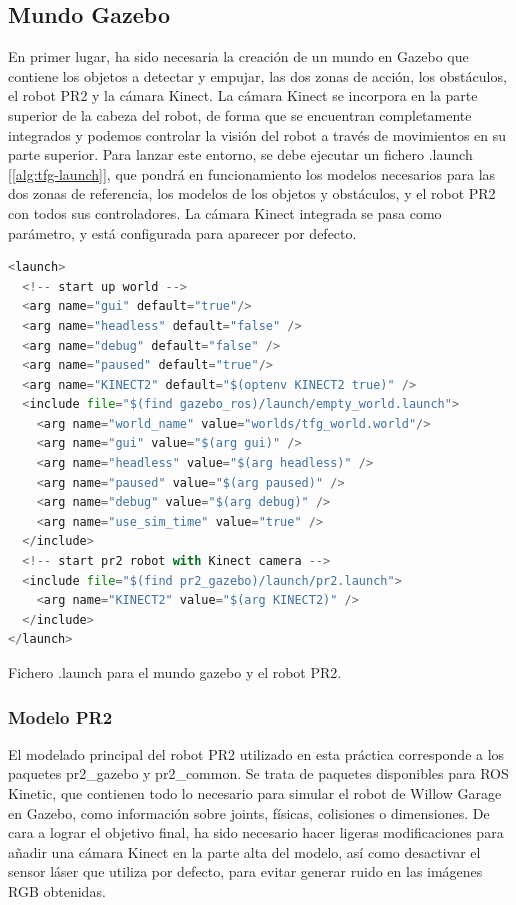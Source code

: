 \documentclass[12pt,spanish,chapterprefix, numbers=noenddot]{book}
\numberwithin{equation}{section}
\numberwithin{figure}{section}
\begin{document}
\subsection{Mundo Gazebo}
En primer lugar, ha sido necesaria la creación de un mundo en Gazebo que contiene los objetos a detectar y empujar, las dos zonas de acción, los obstáculos, el robot PR2 y la cámara Kinect.
La cámara Kinect se incorpora en la parte superior de la cabeza del robot, de forma que se encuentran completamente integrados y podemos controlar la visión del robot a través de movimientos en su parte superior.
Para lanzar este entorno, se debe ejecutar un fichero .launch [\ref{alg:tfg-launch}], que pondrá en funcionamiento los modelos necesarios para las dos zonas de referencia, los modelos de los objetos y obstáculos, y el robot PR2 con todos sus controladores. La cámara Kinect integrada se pasa como parámetro, y está configurada para aparecer por defecto. 
\vspace{20pt}
\begin{algorithm}[htb!]
\begin{lstlisting}[breaklines=true,language=python]
<launch>
  <!-- start up world -->
  <arg name="gui" default="true"/>
  <arg name="headless" default="false" />
  <arg name="debug" default="false" />
  <arg name="paused" default="true"/>
  <arg name="KINECT2" default="$(optenv KINECT2 true)" />
  <include file="$(find gazebo_ros)/launch/empty_world.launch">
    <arg name="world_name" value="worlds/tfg_world.world"/> 
    <arg name="gui" value="$(arg gui)" />
    <arg name="headless" value="$(arg headless)" />
    <arg name="paused" value="$(arg paused)" />
    <arg name="debug" value="$(arg debug)" />
    <arg name="use_sim_time" value="true" />
  </include>
  <!-- start pr2 robot with Kinect camera -->
  <include file="$(find pr2_gazebo)/launch/pr2.launch">
    <arg name="KINECT2" value="$(arg KINECT2)" />
  </include>
</launch>
\end{lstlisting}

\caption{\label{alg:tfg-launch}Fichero .launch para el mundo gazebo y el robot PR2.}
\end{algorithm}

\subsubsection{Modelo PR2}
El modelado principal del robot PR2 utilizado en esta práctica corresponde a los paquetes pr2\_gazebo y pr2\_common. Se trata de paquetes disponibles para ROS Kinetic, que contienen todo lo necesario para simular el robot de Willow Garage en Gazebo, como  información sobre joints, físicas, colisiones o dimensiones.
De cara a lograr el objetivo final, ha sido necesario hacer ligeras modificaciones para añadir una cámara Kinect \cite{gazebo_plugins} en la parte alta del modelo, así como desactivar el sensor láser que utiliza por defecto, para evitar generar ruido en las imágenes RGB obtenidas. 
\end{document}
